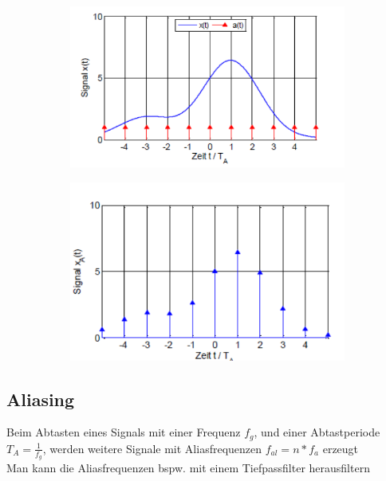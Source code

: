 \documentclass[12pt,a4paper]{article}
\begin{document}
\begin{figure}[H]
\begin{subfigure}{0.42\textwidth}
\includegraphics[width=\textwidth]{./resources/abtast_1.png}
\end{subfigure}
\begin{subfigure}{0.4\textwidth}
\includegraphics[width=\textwidth]{./resources/abtast_2.png}
\end{subfigure}
\end{figure}

\subsection{Aliasing}
Beim Abtasten eines Signals mit einer Frequenz $f_g$, und einer Abtastperiode $T_A = \frac{1}{f_g}$, werden weitere Signale mit Aliasfrequenzen $f_{al} = n \ast f_a$ erzeugt\\
Man kann die Aliasfrequenzen bspw. mit einem Tiefpassfilter herausfiltern\\
\end{document}
